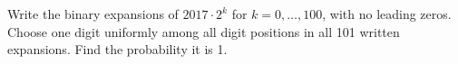 Write the binary expansions of $2017\cdot2^k$ for $k=0,\ldots,100$, with no leading zeros. Choose one digit uniformly among all digit positions in all 101 written expansions. Find the probability it is 1.
